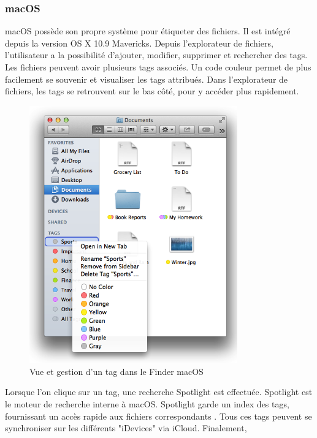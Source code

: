 \documentclass[a4paper, 12pt]{article}
\begin{document}
\subsubsection{macOS}\label{existant_macOS}
macOS possède son propre système pour étiqueter des fichiers. Il est intégré depuis la version 
OS X 10.9 Mavericks. Depuis l'explorateur de fichiers, l'utilisateur a la possibilité 
d'ajouter, modifier, supprimer et rechercher des tags. Les fichiers peuvent avoir plusieurs tags 
associés. Un code couleur permet de plus facilement se souvenir et visualiser les tags attribués. 
Dans l'explorateur de fichiers, les tags se retrouvent sur le bas côté, pour y accéder plus 
rapidement. 
\begin{figure}
    \begin{center}
        \includegraphics[width=0.8\textwidth]{images/macos_tags.png}
    \end{center}
    \caption{Vue et gestion d'un tag dans le Finder macOS \cite{ref5}}
    \label{macos_tags}
\end{figure}
Lorsque l'on clique sur un tag, une recherche Spotlight est effectuée. Spotlight est le moteur de 
recherche interne à macOS. Spotlight garde un index des tags, fournissant un accès rapide aux 
fichiers correspondants \cite{ref9}.
Tous ces tags peuvent se synchroniser sur les différents "iDevices" via iCloud. Finalement, 
\end{document}
